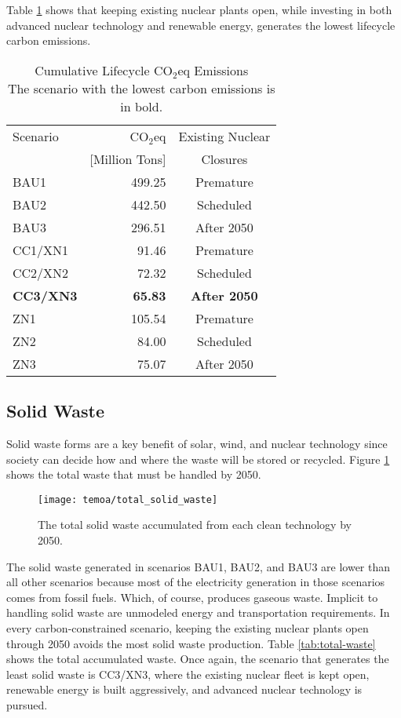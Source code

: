 Table \ref{tab:co2eq-cumulative} shows that keeping existing nuclear
plants open, while investing in both advanced nuclear technology and renewable
energy, generates the lowest lifecycle carbon emissions.

\begin{table}[H]
  \centering
  \caption{Cumulative Lifecycle CO$_2$eq Emissions\\The scenario with the
  lowest carbon emissions is in bold.}
  \label{tab:co2eq-cumulative}
  \begin{tabular}{lrc}
    \hline
    Scenario & CO$_2$eq & Existing Nuclear \\
    & [Million Tons]& Closures \\
    \hline
    BAU1 & 499.25& Premature\\
    BAU2 & 442.50& Scheduled\\
    BAU3 & 296.51& After 2050\\
    CC1/XN1 & 91.46 & Premature\\
    CC2/XN2 & 72.32& Scheduled\\
    \textbf{CC3/XN3} & \textbf{65.83}& \textbf{After 2050}\\
    ZN1 & 105.54& Premature\\
    ZN2 & 84.00& Scheduled\\
    ZN3 & 75.07& After 2050\\
    \hline
  \end{tabular}
\end{table}

\subsection{Solid Waste}

Solid waste forms are a key benefit of solar, wind, and nuclear technology since
society can decide how and where the waste will be stored or recycled. Figure
\ref{fig:total-waste} shows the total waste that must be handled by 2050.

\begin{figure}[H]
  \centering
  \texttt{[image: temoa/total\_solid\_waste]}
  \caption{The total solid waste accumulated from each clean technology by
  2050.}
  \label{fig:total-waste}
\end{figure}

The solid waste generated in scenarios BAU1, BAU2, and BAU3 are lower than all
other scenarios because most of the electricity generation in those scenarios
comes from fossil fuels. Which, of course, produces gaseous waste. Implicit to
handling solid waste are unmodeled energy and transportation requirements.
In every carbon-constrained scenario, keeping the existing nuclear plants open
through 2050 avoids the most solid waste production. Table \ref{tab:total-waste}
shows the total accumulated waste. Once again, the scenario that generates the
least solid waste is CC3/XN3, where the existing nuclear fleet is kept open,
renewable energy is built aggressively, and advanced nuclear technology is
pursued.

